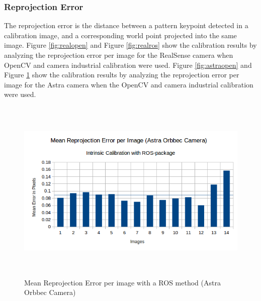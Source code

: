 \subsubsection{Reprojection Error}

The reprojection error is the distance between a pattern keypoint detected in a calibration image, and a corresponding world point projected into the same image. Figure \ref{fig:realopen} and Figure \ref{fig:realros} show the calibration results by analyzing the reprojection error per image for the RealSense camera when OpenCV and camera \textunderscore industrial calibration were used. Figure \ref{fig:astraopen} and Figure \ref{fig:astraros} show the calibration results by analyzing the reprojection error per image for the Astra camera when the OpenCV and camera \textunderscore industrial calibration were used.
\begin{figure}[!h]
\begin{center}
\includegraphics[width=5in, height=3.5in]{figures05/ros_int_cal_astra.png}
\caption{Mean Reprojection Error per image with a ROS method (Astra Orbbec Camera)}%
\label{fig:astraros}
\end{center}
\end{figure}


